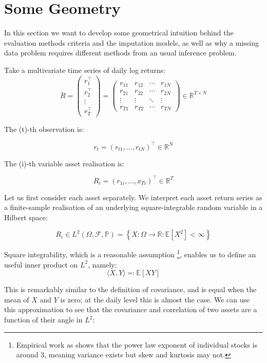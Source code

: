 \section{Some Geometry}
\label{geometry}

In this section we want to develop some geometrical intuition behind the
evaluation methods criteria and the imputation models, as well as why a
missing data problem requires different methods from an usual inference
problem.

Take a multivariate time series of daily log returns:
\[
R =
\begin{pmatrix}
r_1^\top \\
r_2^\top \\
\vdots \\
r_T^\top
\end{pmatrix}
=
\begin{pmatrix}
r_{11} & r_{12} & \cdots & r_{1N}\\
r_{21} & r_{22} & \cdots & r_{2N}\\
\vdots & \vdots & \ddots & \vdots\\
r_{T1} & r_{T2} & \cdots & r_{TN}
\end{pmatrix}
\in\mathbb{R}^{T\times N}
\]

The (t)-th observation is:

\[
r_t =
(r_{t1},\ldots,r_{tN})^\top
\in\mathbb{R}^N
\]

The (i)-th variable asset realisation is:

\[
R_i =
(r_{1i},\ldots,x_{Ti})^\top
\in\mathbb{R}^T
\]

Let us first consider each asset separately.
We interpret each asset return series as a finite-sample realisation of an underlying square-integrable random variable
in a Hilbert space:

\[
R_i \in
L^2(\Omega,\mathcal{F},\mathbb{P})
=
\left\{
X:\Omega\rightarrow\mathbb{R}
:
\mathbb{E}[X^2]<\infty
\right\}
\]

Square integrability, which is a reasonable assumption \footnote{Empirical work as \cite{plerou1999} shows
that the power law exponent of individual stocks is around 3, meaning variance exists but skew and kurtosis may not.},
enables us to define an useful inner product
on $L^2$, namely:
\[
\langle X,Y\rangle
\eqqcolon
\mathbb{E}[XY]
\]

This is remarkably similar to the definition of covariance, and is equal when the mean
of $X$ and $Y$ is zero; at the daily level this is almost the case. We can use this
approximation to see that the covariance and correlation of two assets are a function
of their angle in $L^2$:

